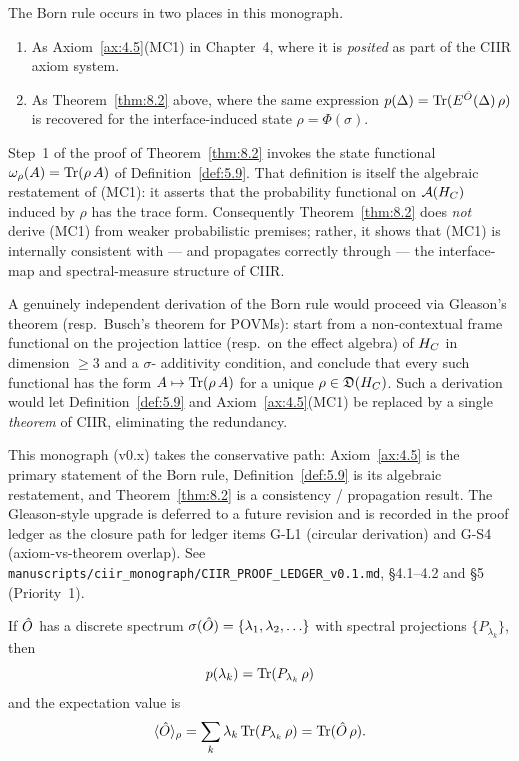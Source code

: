 \begin{remark}
\label{rem:8.born-status}
The Born rule occurs in two places in this monograph.
\begin{enumerate}
  \item[(a)] As Axiom~\ref{ax:4.5}(MC1) in Chapter~4, where it is
    \emph{posited} as part of the CIIR axiom system.
  \item[(b)] As Theorem~\ref{thm:8.2} above, where the same expression
    $p(\Delta) = \mathrm{Tr}(E^{\hat{O}}(\Delta)\,\rho)$ is recovered for the
    interface-induced state $\rho = \Phi(\sigma)$.
\end{enumerate}
Step~1 of the proof of Theorem~\ref{thm:8.2} invokes the state
functional $\omega_\rho(A) = \mathrm{Tr}(\rho\,A)$ of
Definition~\ref{def:5.9}.  That definition is itself the algebraic
restatement of (MC1): it asserts that the probability functional on
$\mathcal{A}(H_C)$ induced by $\rho$ has the trace form.  Consequently
Theorem~\ref{thm:8.2} does \emph{not} derive (MC1) from weaker
probabilistic premises; rather, it shows that (MC1) is internally
consistent with — and propagates correctly through — the
interface-map and spectral-measure structure of CIIR.

A genuinely independent derivation of the Born rule would proceed via
Gleason's theorem (resp.~Busch's theorem for POVMs): start from a
non-contextual frame functional on the projection lattice (resp.~on
the effect algebra) of $H_C$ in dimension $\geq 3$ and a $\sigma$-
additivity condition, and conclude that every such functional has the
form $A \mapsto \mathrm{Tr}(\rho\,A)$ for a unique $\rho \in
\mathfrak{D}(H_C)$.  Such a derivation would let
Definition~\ref{def:5.9} and Axiom~\ref{ax:4.5}(MC1) be replaced by a
single \emph{theorem} of CIIR, eliminating the redundancy.

This monograph (v0.x) takes the conservative path: Axiom~\ref{ax:4.5}
is the primary statement of the Born rule, Definition~\ref{def:5.9}
is its algebraic restatement, and Theorem~\ref{thm:8.2} is a
consistency / propagation result.  The Gleason-style upgrade is
deferred to a future revision and is recorded in the proof ledger as
the closure path for ledger items
\textnormal{G-L1} (circular derivation) and
\textnormal{G-S4} (axiom-vs-theorem overlap).  See
\texttt{manuscripts/ciir\_monograph/CIIR\_PROOF\_LEDGER\_v0.1.md},
\S{}4.1--4.2 and \S{}5 (Priority~1).
\end{remark}

\begin{corollary}
\label{cor:8.1}
If $\hat{O}$ has a discrete spectrum
$\sigma(\hat{O}) = \{\lambda_1, \lambda_2, \ldots\}$ with spectral
projections $\{P_{\lambda_k}\}$, then
\[
  p(\lambda_k) = \mathrm{Tr}(P_{\lambda_k}\,\rho)
\]
and the expectation value is
\[
  \langle\hat{O}\rangle_\rho
  = \sum_k \lambda_k\,\mathrm{Tr}(P_{\lambda_k}\,\rho)
  = \mathrm{Tr}(\hat{O}\,\rho).
\]
\end{corollary}

